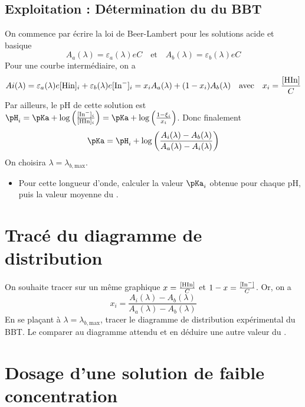 \documentclass{tp}
\begin{document}
\subsection{Exploitation : Détermination du \pKa{} du BBT}%
\label{sub:exploitation_determination_du_pka}

On commence par écrire la loi de Beer-Lambert pour les solutions acide et basique
\begin{equation}
  A_a(\lambda) = \varepsilon_a(\lambda)eC \quad \text{et} \quad A_b(\lambda)=\varepsilon_b(\lambda)eC
\end{equation}
Pour une courbe intermédiaire, on a 
\begin{equation}
  Ai(\lambda) = \varepsilon_a(\lambda)e[\ce{Hin}]_i + \varepsilon_b(\lambda)e[\ce{In-}]_i = x_iA_a(\lambda) + (1-x_i)A_b(\lambda) \quad \text{avec} \quad x_i=\frac{[\ce{HIn}]}{C}
\end{equation}
Par ailleurs, le pH de cette solution est $\pH_i = \pKa + \log \left( \frac{[\ce{In-}]_i}{[\ce{HIn}]_i} \right)=\pKa+\log\left( \frac{1-\xi_i}{x_i} \right) $. Donc finalement
\begin{equation}
  \pKa = \pH_i + \log\left( \frac{A_i(\lambda)-A_b(\lambda)}{A_a(\lambda)-A_i(\lambda)} \right) 
\end{equation}
On choisira $\lambda=\lambda_{b,\text{max}}$. 
\begin{itemize}
  \item Pour cette longueur d'onde, calculer la valeur $\pKa_i$ obtenue pour chaque pH, puis la valeur moyenne du \pKa. 
\end{itemize}

\section{Tracé du diagramme de distribution}%
\label{sec:trace_du_diagramme_de_distribution}

On souhaite tracer sur un même graphique $x=\frac{[\ce{HIn}]}{C}$ et $1-x=\frac{[\ce{In-}]}{C}$. Or, on a
\begin{equation}
  x_i = \frac{A_i(\lambda)-A_b(\lambda)}{A_a(\lambda)-A_b(\lambda)}
\end{equation}
En se plaçant à $\lambda=\lambda_{b, \text{max}}$, tracer le diagramme de distribution expérimental du BBT. Le comparer au diagramme attendu et en déduire une autre valeur du \pKa.

\section{Dosage d'une solution de faible concentration}%
\label{sec:dosage_d_une_solution_de_faible_concentration}
\end{document}

